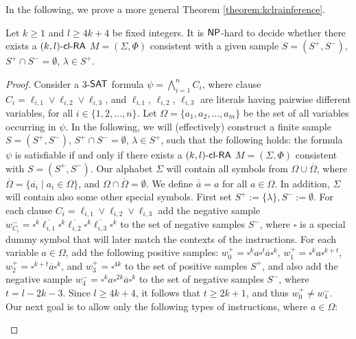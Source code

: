 In the following, we prove a more general Theorem \ref{theorem:kclrainference}.

\begin{theorem}\label{theorem:kclrainference}
Let $k \ge 1 $ and $l \ge 4k + 4$ be fixed integers. It is $\textup{\sf NP}$-hard to decide whether there exists a $\textup{\sf $(k,l)$-\textup{\sf cl-RA\/}}$ $M = (\Sigma, \Phi)$ consistent with a given sample $S = (S^+, S^-)$, $S^+ \cap S^- = \emptyset$, $\lambda \in S^+$.
\end{theorem}

\begin{proof}
Consider a $3$-$\textup{\sf SAT}$ formula $\psi = \bigwedge_{i=1}^n C_i$, where clause $C_i = \ell_{i,1} \vee \ell_{i,2} \vee \ell_{i,3}$, and $\ell_{i,1}$, $\ell_{i,2}$, $\ell_{i,3}$ are literals having pairwise different variables, for all $i \in \{1, 2, \ldots, n\}$. Let $\Omega = \{a_1, a_2, \ldots, a_m\}$ be the set of all variables occurring in $\psi$. In the following, we will (effectively) construct a finite sample $S = (S^+, S^-)$, $S^+ \cap S^- = \emptyset$, $\lambda \in S^+$, such that the following holds: the formula $\psi$ is satisfiable if and only if there exists a $\textup{\sf $(k,l)$-\textup{\sf cl-RA\/}}$ $M = (\Sigma, \Phi)$ consistent with $S = (S^+, S^-)$. Our alphabet $\Sigma$ will contain all symbols from $\Omega \cup \overline{\Omega}$, where $\overline{\Omega} = \{ \overline{a_i} \mid a_i \in \Omega \}$, and $\Omega \cap \overline{\Omega} = \emptyset$. We define $\overline{\overline{a}} = a$ for all $a \in \Omega$. In addition, $\Sigma$ will contain also some other special symbols. First set $S^+ := \{ \lambda \}, S^- := \emptyset$. For each clause $C_i = \ell_{i,1} \vee \ell_{i,2} \vee \ell_{i,3}$ add the negative sample $w_{C_i}^- = \square^k \overline{\ell_{i,1}} \square^k \overline{\ell_{i,2}} \square^k \overline{\ell_{i,3}} \square^k$ to the set of negative samples $S^-$, where $\square$ is a special dummy symbol that will later match the contexts of the instructions. For each variable $a \in \Omega$, add the following  positive samples: $w_0^+ = \square^k a \square^t \overline{a} \square^k$, $w_1^+ = \square^k a \square^{k+t}$, $w_2^+ = \square^{k+t} \overline{a} \square^k$, and $w_3^+ = \square^{4k}$ to the set of positive samples $S^+$, and also add the negative sample $w_4^- = \square^k a \square^{2k}  \overline{a} \square^k$ to the set of negative samples $S^-$, where $t = l - 2k - 3$. Since $l \ge 4k + 4$, it follows that $t \ge 2k + 1$, and thus $w_0^+ \neq w_4^-$. Our next goal is to allow only the following types of instructions, where $a \in \Omega$:
\begin{enumerate}

\end{enumerate}
\end{proof}
